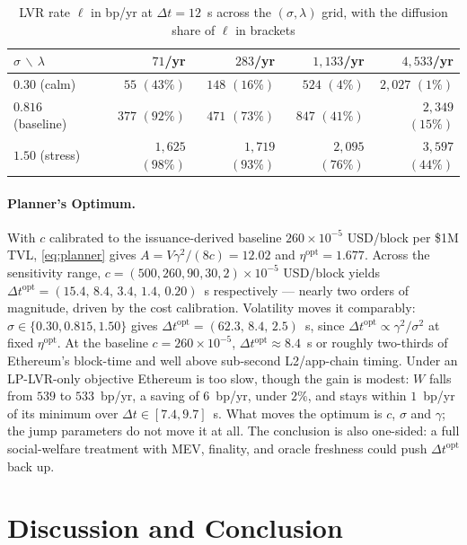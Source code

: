\documentclass[runningheads]{llncs}
\newcommand{\dt}{\Delta t}
\newcommand{\1}{\mathbf{1}}
\begin{document}
\begin{table}[htbp]
\centering
\caption{LVR rate $\ell$ in bp/yr at $\dt = 12$~s across the $(\sigma,\lambda)$ grid, with the diffusion share of $\ell$ in brackets}\label{tab:grid}
\begin{tabular}{lrrrr}
\toprule
$\sigma \,\backslash\, \lambda$ & $71$/yr & $283$/yr & $1{,}133$/yr & $4{,}533$/yr \\
\midrule
$0.30$ (calm)      & $55$ $(43\%)$      & $148$ $(16\%)$     & $524$ $(4\%)$      & $2{,}027$ $(1\%)$ \\
$0.816$ (baseline) & $377$ $(92\%)$     & $471$ $(73\%)$     & $847$ $(41\%)$     & $2{,}349$ $(15\%)$ \\
$1.50$ (stress)    & $1{,}625$ $(98\%)$ & $1{,}719$ $(93\%)$ & $2{,}095$ $(76\%)$ & $3{,}597$ $(44\%)$ \\
\bottomrule
\end{tabular}
\end{table}

\paragraph{Planner's Optimum.}
With $c$ calibrated to the issuance-derived baseline $260 \times 10^{-5}$ USD/block per \$1M TVL, \eqref{eq:planner} gives $A = V\gamma^2/(8c) = 12.02$ and $\eta^{\mathrm{opt}} = 1.677$. Across the sensitivity range, $c = (500, 260, 90, 30, 2)\times10^{-5}$ USD/block yields $\dt^{\mathrm{opt}} = (15.4,\, 8.4,\, 3.4,\, 1.4,\, 0.20)$~s respectively --- nearly two orders of magnitude, driven by the cost calibration. Volatility moves it comparably: $\sigma \in \{0.30, 0.815, 1.50\}$ gives $\dt^{\mathrm{opt}} = (62.3,\, 8.4,\, 2.5)$~s, since $\dt^{\mathrm{opt}} \propto \gamma^2/\sigma^2$ at fixed $\eta^{\mathrm{opt}}$. At the baseline $c = 260 \times 10^{-5}$, $\dt^{\mathrm{opt}} \approx 8.4$~s or roughly two-thirds of Ethereum's block-time and well above sub-second L2/app-chain timing. Under an LP-LVR-only objective Ethereum is too slow, though the gain is modest: $W$ falls from $539$ to $533$~bp/yr, a saving of $6$~bp/yr, under $2\%$, and stays within $1$~bp/yr of its minimum over $\dt \in [7.4, 9.7]$~s. What moves the optimum is $c$, $\sigma$ and $\gamma$; the jump parameters do not move it at all. The conclusion is also one-sided: a full social-welfare treatment with MEV, finality, and oracle freshness could push $\dt^{\mathrm{opt}}$ back up.

\section{Discussion and Conclusion}\label{sec:disc}
\end{document}
